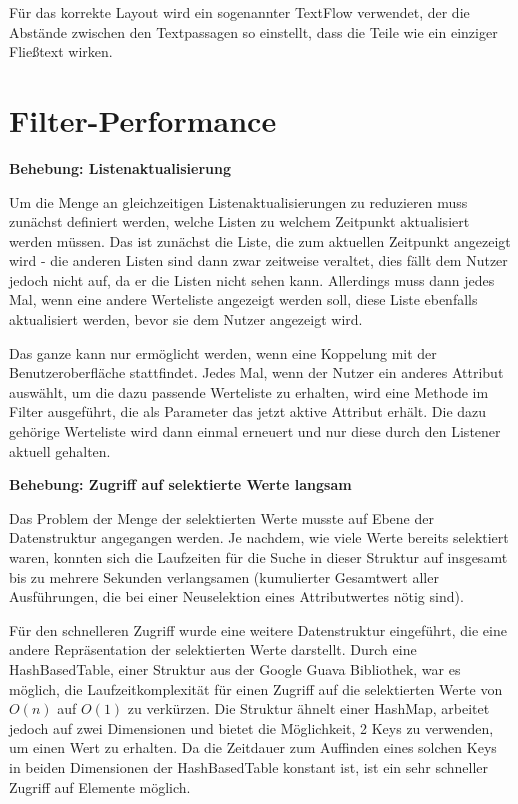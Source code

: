 Für das korrekte Layout wird ein sogenannter TextFlow verwendet, der die Abstände zwischen den Textpassagen so einstellt, dass die Teile wie ein einziger Fließtext wirken.

\section{Filter-Performance} \label{sec:verbFilterPerformance}
\textbf{Behebung: Listenaktualisierung}

Um die Menge an gleichzeitigen Listenaktualisierungen zu reduzieren muss zunächst definiert werden, welche Listen zu welchem Zeitpunkt aktualisiert werden müssen. Das ist zunächst die Liste, die zum aktuellen Zeitpunkt angezeigt wird - die anderen Listen sind dann zwar zeitweise veraltet, dies fällt dem Nutzer jedoch nicht auf, da er die Listen nicht sehen kann. Allerdings muss dann jedes Mal, wenn eine andere Werteliste angezeigt werden soll, diese Liste ebenfalls aktualisiert werden, bevor sie dem Nutzer angezeigt wird.

Das ganze kann nur ermöglicht werden, wenn eine Koppelung mit der Benutzeroberfläche stattfindet. Jedes Mal, wenn der Nutzer ein anderes Attribut auswählt, um die dazu passende Werteliste zu erhalten, wird eine Methode im Filter ausgeführt, die als Parameter das jetzt aktive Attribut erhält. Die dazu gehörige Werteliste wird dann einmal erneuert und nur diese durch den Listener aktuell gehalten.

\textbf{Behebung: Zugriff auf selektierte Werte langsam}

Das Problem der Menge der selektierten Werte musste auf Ebene der Datenstruktur angegangen werden. Je nachdem, wie viele Werte bereits selektiert waren, konnten sich die Laufzeiten für die Suche in dieser Struktur auf insgesamt bis zu mehrere Sekunden verlangsamen (kumulierter Gesamtwert aller Ausführungen, die bei einer Neuselektion eines Attributwertes nötig sind).

Für den schnelleren Zugriff wurde eine weitere Datenstruktur eingeführt, die eine andere Repräsentation der selektierten Werte darstellt. Durch eine HashBasedTable, einer Struktur aus der Google Guava Bibliothek, war es möglich, die Laufzeitkomplexität für einen Zugriff auf die selektierten Werte von $O(n)$ auf $O(1)$ zu verkürzen. Die Struktur ähnelt einer HashMap, arbeitet jedoch auf zwei Dimensionen und bietet die Möglichkeit, 2 Keys zu verwenden, um einen Wert zu erhalten. Da die Zeitdauer zum Auffinden eines solchen Keys in beiden Dimensionen der HashBasedTable konstant ist, ist ein sehr schneller Zugriff auf Elemente möglich.

